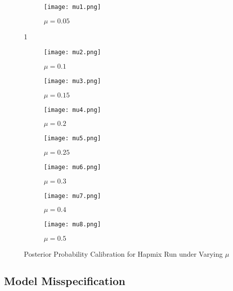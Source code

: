 \documentclass{article}
\begin{document}
\begin{figure}[H]
     \centering
     \begin{subfigure}[b]{0.225\textwidth}
         \centering
         \texttt{[image: mu1.png]}
         \caption{$\mu=0.05$}
         \label{fig:mu=0.05}
     \end{subfigure}1
     \hfill
     \begin{subfigure}[b]{0.225\textwidth}
         \centering
         \texttt{[image: mu2.png]}
         \caption{$\mu=0.1$}
         \label{fig:mu=0.1}
     \end{subfigure}
     \hfill
     \begin{subfigure}[b]{0.225\textwidth}
         \centering
         \texttt{[image: mu3.png]}
         \caption{$\mu=0.15$}
         \label{fig:mu3}
     \end{subfigure}
     \hfill
     \begin{subfigure}[b]{0.225\textwidth}
         \centering
         \texttt{[image: mu4.png]}
         \caption{$\mu=0.2$}
         \label{fig:mu4}
     \end{subfigure}
     \vfill
     \begin{subfigure}[b]{0.225\textwidth}
         \centering
         \texttt{[image: mu5.png]}
         \caption{$\mu=0.25$}
         \label{fig:mu=0.25}
     \end{subfigure}
     \hfill
     \begin{subfigure}[b]{0.225\textwidth}
         \centering
         \texttt{[image: mu6.png]}
         \caption{$\mu=0.3$}
         \label{fig:mu=0.3}
     \end{subfigure}
     \hfill
     \begin{subfigure}[b]{0.225\textwidth}
         \centering
         \texttt{[image: mu7.png]}
         \caption{$\mu=0.4$}
         \label{fig:mu4}
     \end{subfigure}
     \hfill
     \begin{subfigure}[b]{0.225\textwidth}
         \centering
         \texttt{[image: mu8.png]}
         \caption{$\mu=0.5$}
         \label{fig:mu8}
     \end{subfigure}
        \caption{Posterior Probability Calibration for Hapmix Run under Varying $\mu$}
        \label{fig:mu}
\end{figure}




\subsection{Model Misspecification}
\end{document}
